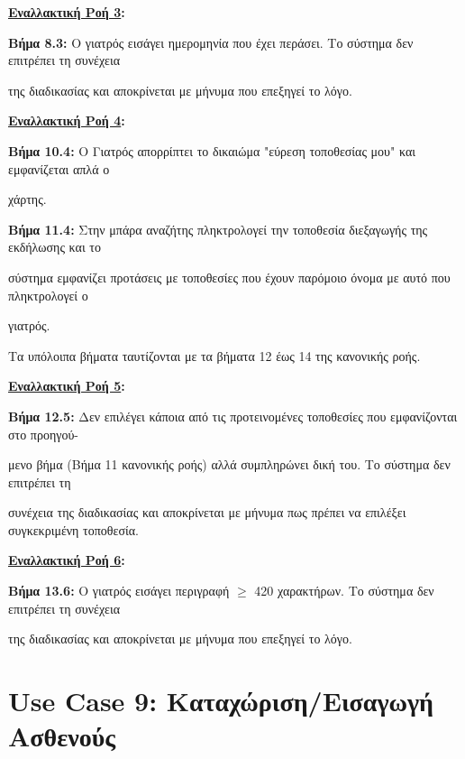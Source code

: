 \documentclass{article}
\begin{document}
\textbf{\underline{Εναλλακτική Ροή 3}:} \vspace{0.2cm}
\par \textbf{Βήμα 8.3:} Ο γιατρός εισάγει ημερομηνία που έχει περάσει. Το σύστημα δεν επιτρέπει τη συνέχεια \par της διαδικασίας και αποκρίνεται με μήνυμα που επεξηγεί το λόγο. \vspace{0.2cm}

\textbf{\underline{Εναλλακτική Ροή 4}:} \vspace{0.2cm}
\par \textbf{Βήμα 10.4:} Ο Γιατρός απορρίπτει το δικαιώμα "εύρεση τοποθεσίας μου" και εμφανίζεται απλά ο \par χάρτης. \vspace{0.1cm}
\par \textbf{Βήμα 11.4:} Στην μπάρα αναζήτης πληκτρολογεί την τοποθεσία διεξαγωγής της εκδήλωσης και το \par σύστημα εμφανίζει προτάσεις με τοποθεσίες που έχουν παρόμοιο όνομα με αυτό που πληκτρολογεί ο \par γιατρός. \vspace{0.1cm}

Τα υπόλοιπα βήματα ταυτίζονται με τα βήματα 12 έως 14 της κανονικής ροής. \vspace{0.2cm}

\textbf{\underline{Εναλλακτική Ροή 5}:} \vspace{0.2cm}
\par \textbf{Βήμα 12.5:} Δεν επιλέγει κάποια από τις προτεινομένες τοποθεσίες που εμφανίζονται στο προηγού- \par μενο βήμα (Βήμα 11 κανονικής ροής) αλλά συμπληρώνει δική του. Το σύστημα δεν επιτρέπει τη \par συνέχεια της διαδικασίας και αποκρίνεται με μήνυμα πως πρέπει να επιλέξει συγκεκριμένη τοποθεσία. \vspace{0.2cm}

\textbf{\underline{Εναλλακτική Ροή 6}:} \vspace{0.2cm}
\par \textbf{Βήμα 13.6:} Ο γιατρός εισάγει περιγραφή $\ge$ 420 χαρακτήρων. Το σύστημα δεν επιτρέπει τη συνέχεια \par της διαδικασίας και αποκρίνεται με μήνυμα που επεξηγεί το λόγο.

\section{Use Case 9: Καταχώριση/Εισαγωγή Ασθενούς}
\end{document}
